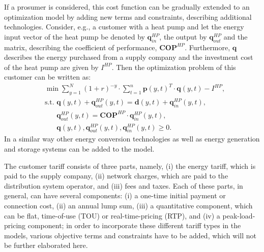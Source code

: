 \documentclass[a4paper,twoside]{article}
\begin{document}
If a prosumer is considered, this cost function can be gradually
extended to an optimization model by adding new terms and constraints,
describing additional technologies. Consider, e.g., a customer with a
heat pump and let the energy input vector of the heat pump be denoted
by $\mathbf{q}_{in}^{HP}$, the output by $\mathbf{q}_{out}^{HP}$ and the matrix,
describing the coefficient of performance, $\mathbf{COP}^{HP}$. Furthermore,
$\mathbf{q}$ describes the energy purchased from a supply company and the
investment cost of the heat pump are given by $I^{HP}$. Then the
optimization problem of this customer can be written as: 
\begin{align}
  & \min \sum_{y=1}^{N}(1+r)^{-y} \cdot \sum_{t=1}^{n} \mathbf{p}(y,t)^T \cdot
  \mathbf{q}(y,t) - I^{HP}, \\
  & \textrm{s.t. } \mathbf{q}(y,t) + \mathbf{q}_{out}^{HP} (y,t)  = \mathbf{d}(y,t) +
                     \mathbf{q}_{in}^{HP} (y,t), \\
  & \phantom{\textrm{s.t. }}\mathbf{q}_{out}^{HP}(y,t) = \mathbf{COP}^{HP} \cdot \mathbf{q}_{in}^{HP} (y,t), \\
  & \phantom{\textrm{s.t. }}\mathbf{q}(y,t), \mathbf{q}_{out}^{HP}(y,t), \mathbf{q}_{in}^{HP}(y,t) \geq 0.
\end{align} %
In a similar way other energy conversion technologies as well as
energy generation and storage systems can be added to the model. 

The customer tariff consists of three parts, namely, (i) the energy
tariff, which is paid to the supply company, (ii) network charges,
which are paid to the distribution system operator, and (iii) fees and
taxes. Each of these parts, in general, can have several components:
(i) a one-time initial payment or connection cost, (ii) an annual lump
sum, (iii) a quantitative component, which can be flat, time-of-use (TOU) or real-time-pricing (RTP),
and (iv) a peak-load-pricing component; in order to incorporate these
different tariff types in the models, various objective terms and
constraints have to be added, which will not be further elaborated
here. 
\end{document}
